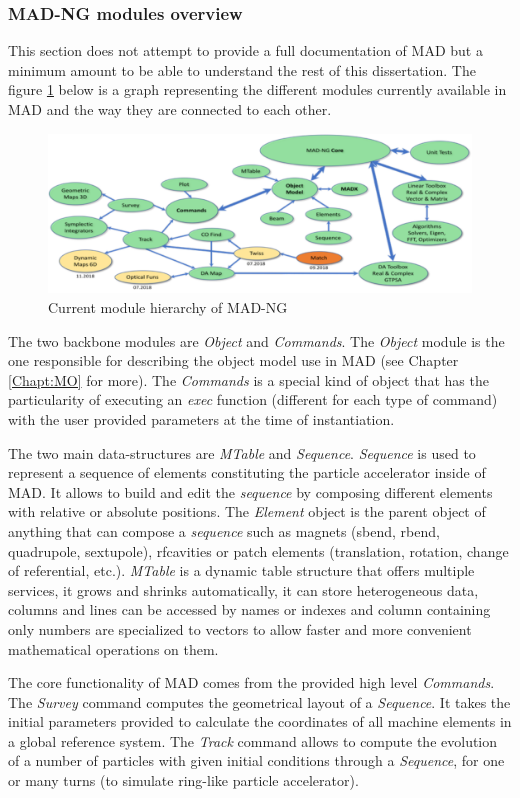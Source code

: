 \subsubsection{MAD-NG modules overview}
\label{Subsec:mad-doc}

This section does not attempt to provide a full documentation of MAD but a
minimum amount to be able to understand the rest of this dissertation.
The figure \ref{fig:mad-graph} below is a graph representing the different
modules currently available in MAD and the way they are connected to each other.

\begin{figure}[H]
    \centering
	\includegraphics[width=\textwidth]{./Images/mad-graph.pdf}
    \caption{Current module hierarchy of MAD-NG}
    \label{fig:mad-graph}
\end{figure}

The two backbone modules are \emph{Object} and \emph{Commands}. The \emph{Object}
module is the one responsible for describing the object model use in MAD (see
Chapter \ref{Chapt:MO} for more). The \emph{Commands} is a special kind of
object that has the particularity of executing an \emph{exec} function
(different for each type of command) with the user provided parameters at the
time of instantiation.

The two main data-structures are \emph{MTable} and \emph{Sequence}.
\emph{Sequence} is used to represent a sequence of elements constituting the
particle accelerator inside of MAD. It allows to build and edit the
\emph{sequence} by
composing different elements with relative or absolute positions.
The \emph{Element} object is the parent object of anything that can compose a
\emph{sequence} such as magnets (sbend, rbend, quadrupole, sextupole),
rfcavities or patch elements (translation, rotation, change of referential,
etc.). \emph{MTable} is a dynamic table structure that offers multiple
services, it grows and shrinks automatically, it can store heterogeneous data,
columns and lines can be accessed by names or indexes and column containing only
numbers are specialized to vectors to allow faster and more convenient
mathematical operations on them.

The core functionality of MAD comes from the provided high level \emph{Commands}.
The \emph{Survey} command computes the geometrical layout of a \emph{Sequence}.
It takes the initial parameters provided to calculate the coordinates of all
machine elements in a global reference system. The \emph{Track} command allows
to compute the evolution of a number of particles with given initial conditions
through a \emph{Sequence}, for one or many turns (to simulate ring-like particle
accelerator).